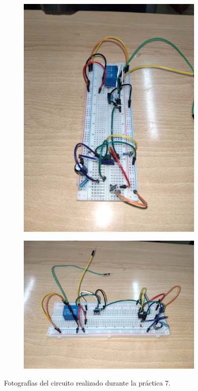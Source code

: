 \begin{figure}[htb]
\begin{subfigure}[htb]{0.45\textwidth}
        \includegraphics[width=\textwidth]{media/circuito_real_2}
        \caption{}
    \end{subfigure}
    \centering
    \begin{subfigure}[htb]{0.45\textwidth}
        \centering
        \includegraphics[width=\textwidth]{media/circuito_real_3}
        \caption{}
    \end{subfigure}
    \caption{Fotografías del circuito realizado durante la práctica 7.}
    \label{Fig: Fotografias del circuito realizado durante la practica 7}
\end{figure}

